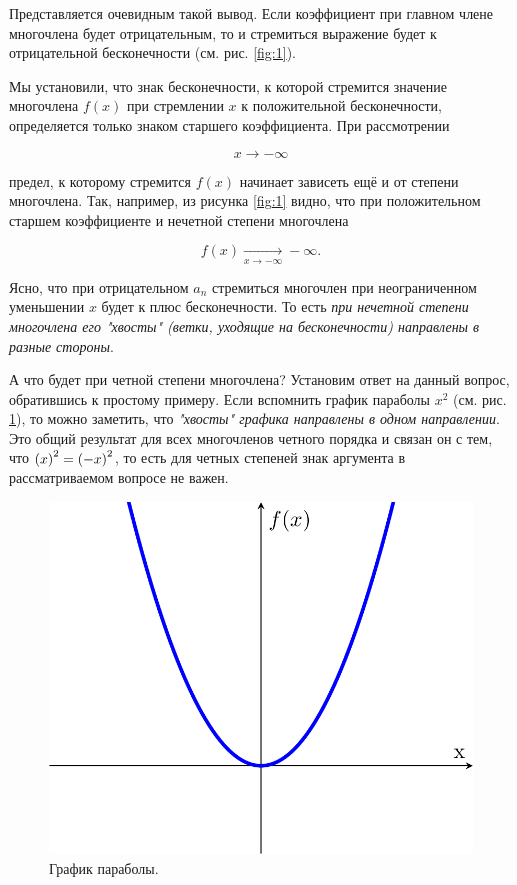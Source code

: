 \documentclass[12pt]{article}
\begin{document}
\par
Представляется очевидным такой вывод. Если коэффициент при главном члене многочлена будет отрицательным, то и стремиться выражение будет к отрицательной бесконечности (см. рис. \ref{fig:1}).

\par 
Мы установили, что знак бесконечности, к которой стремится значение многочлена $f(x)$ при стремлении $x$ к положительной бесконечности, определяется только знаком старшего коэффициента. При рассмотрении 

\begin{equation}
x\rightarrow-\infty
\end{equation}

предел, к которому стремится $f(x)$ начинает зависеть ещё и от степени многочлена. Так, например, из рисунка \ref{fig:1} видно, что при положительном старшем коэффициенте и нечетной степени многочлена 

\begin{equation}
	f(x) \underset{x\rightarrow-\infty}{\longrightarrow}-\infty.
\end{equation}

Ясно, что при отрицательном $a_n$ стремиться многочлен при неограниченном уменьшении $x$ будет к плюс бесконечности. То есть \emph{при нечетной степени многочлена его "хвосты" (ветки, уходящие на бесконечности) направлены в разные стороны}. 

\par 
А что будет при четной степени многочлена? Установим ответ на данный вопрос, обратившись к простому примеру. Если вспомнить график параболы $x^2$ (см. рис. \ref{fig:2}), то можно заметить, что \emph{"хвосты" графика направлены в одном направлении}. Это общий результат для всех многочленов четного порядка и связан он с тем, что $\qty(x)^2 = \qty(-x)^2$, то есть для четных степеней знак аргумента в рассматриваемом вопросе не важен. 

\begin{figure}[htbp]
\centering
\includegraphics[width=1\linewidth]{fig2}
\caption{График параболы.}
\label{fig:2}
\end{figure}
\end{document}

